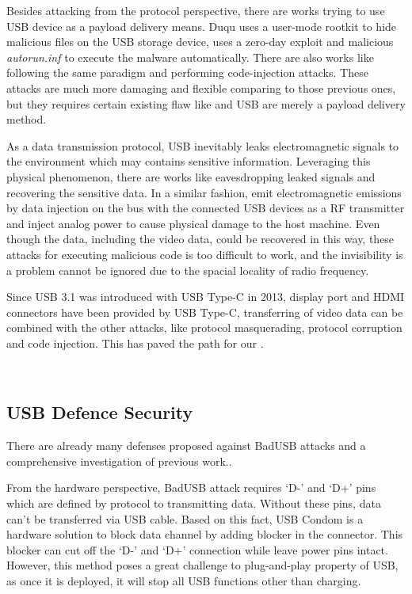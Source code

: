 Besides attacking from the protocol perspective, there are works trying to use USB device as a payload delivery means. Duqu\cite{duqu} uses a user-mode rootkit to hide malicious files on the USB storage device, \cite{flame} uses a zero-day exploit and malicious \textit{autorun.inf} to execute the malware automatically. There are also works like \cite{brain, stuxnet, conficker} following the same paradigm and performing code-injection attacks. These attacks are much more damaging and flexible comparing to those previous ones, but they requires certain existing flaw like \cite{zero-day} and USB are merely a payload delivery method.

As a data transmission protocol, USB inevitably leaks electromagnetic signals to the environment which may contains sensitive information. Leveraging this physical phenomenon, there are works like \cite{smartphone, poweremi,revealing,su2017usb, usbgpslocator, bates2014leveraging, badusbhub, usbfinger, side, usbdriver} eavesdropping leaked signals and recovering the sensitive data. In a similar fashion, \cite{usbee, turnip} emit electromagnetic emissions by data injection on the bus with the connected USB devices as a RF transmitter and \cite{usbkiller, cable} inject analog power to cause physical damage to the host machine. Even though the data, including the video data, could be recovered in this way, these attacks for executing malicious code is too difficult to work, and the invisibility is a problem cannot be ignored due to the spacial locality of radio frequency.

Since USB 3.1 was introduced with USB Type-C in 2013, display port and HDMI connectors have been provided by USB Type-C, transferring of video data can be combined with the other attacks, like protocol masquerading,  protocol corruption and code injection. This has paved the path for our \tool.




\\


\subsection{USB Defence Security}
\label{subsec:usb_defence}
There are already many defenses proposed against BadUSB attacks and a comprehensive investigation of previous work.\cite{sok}.

From the hardware perspective, BadUSB attack requires `D-' and `D+' pins which are defined by protocol to transmitting data.
Without these pins, data can't be transferred via USB cable. Based on this fact, USB Condom \cite{Condom} is a hardware solution to block data channel by adding blocker in the connector. This blocker can cut off the `D-' and `D+' connection while leave power pins intact.
However, this method poses a great challenge to plug-and-play property of USB, as once it is deployed, it will stop all USB functions other than charging.

